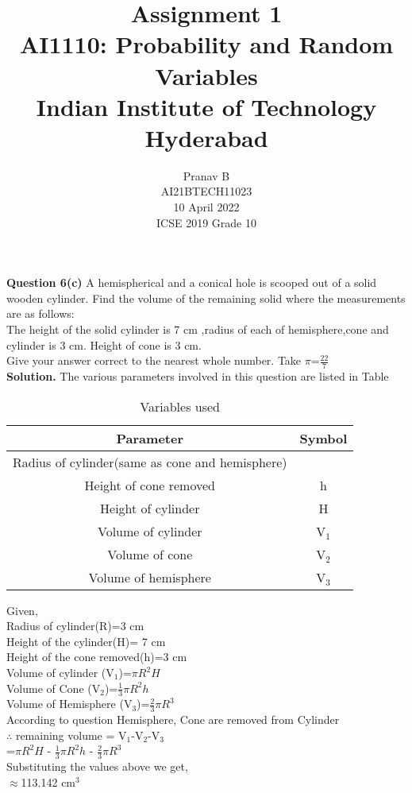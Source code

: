 \documentclass[journal,12pt,twocolumn]{IEEEtran}
\title{Assignment 1 \\ \Large AI1110: Probability and Random Variables \\ \large Indian Institute of Technology Hyderabad}
\author{Pranav B \\ \normalsize AI21BTECH11023 \\ \vspace*{20pt} \normalsize  10 April 2022 \\ \vspace*{20pt} \Large ICSE 2019 Grade 10}
\begin{document}
	\maketitle
	
	\textbf{Question 6(c)} 
	A hemispherical and a conical hole is scooped out of a solid wooden cylinder. Find the volume of the remaining solid where the measurements are as follows:\\
	The height of the solid cylinder is 7 cm ,radius of each of hemisphere,cone and cylinder is 3 cm. Height of cone is 3 cm.\\
	Give your answer correct to the nearest whole number. Take $\pi$=$\frac{22}{7}$\\
	\textbf{Solution.}
	The various parameters involved in this question are listed in Table \begin{table}[h]
\caption{Variables used}
\begin{tabular}{|c|c|}
\hline
Parameter & Symbol\\
\hline
Radius of cylinder(same as cone and hemisphere) \\
\hline
Height of cone removed & h \\
\hline
Height of cylinder & H  \\
\hline
Volume of cylinder & V$_1$ \\
\hline
Volume of cone  & V$_2$\\
\hline
Volume of hemisphere & V$_3$\\
\hline
\end{tabular}
\end{table}
	
	Given,\\
Radius of cylinder(R)=3 cm\\
Height of the cylinder(H)= 7 cm\\
Height of the cone removed(h)=3 cm\\
Volume of cylinder (V$_1$)=$\pi R^2 H$\\
Volume of Cone (V$_2$)=$\frac{1}{3} \pi R^2 h$\\
Volume of Hemisphere (V$_3$)=$\frac{2}{3} \pi R^3$\\
According to question Hemisphere, Cone are removed from Cylinder\\
$\therefore$ remaining volume = V$_1$-V$_2$-V$_3$\\
=$\pi R^2 H$ - $\frac{1}{3} \pi R^2 h$ - $\frac{2}{3} \pi R^3$\\
Substituting the values above we get,\\
$\approx$113.142 cm$^3$	
			
\end{document}
